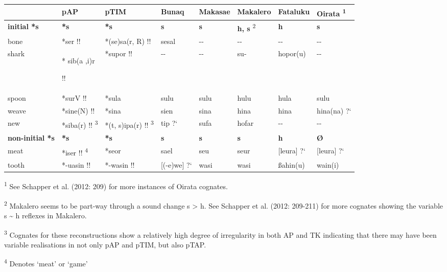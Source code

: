 \documentclass[a4paper]{article}
\begin{document}
\begin{center}
\tablehead{}
\begin{supertabular}{m{0.9677598in}m{0.9406598in}m{0.9004598in}m{0.63935983in}m{0.66775984in}m{0.7052598in}m{0.8316598in}m{0.65735984in}}
\hline
 &
pAP &
pTIM &
Bunaq &
Makasae &
Makalero &
Fataluku &
Oirata \textsuperscript{1}\\\hline
\textbf{initial *s} &
\textbf{*s} &
\textbf{*s} &
\textbf{s} &
\textbf{s} &
\textbf{h, s }\textsuperscript{2} &
\textbf{h} &
\textbf{s }\\\hline
bone &
*ser !! &
*(se)sa(r, R) !! &
sesal &
{}-{}- &
{}-{}- &
{}-{}- &
{}-{}-\\
shark &
* sib(a ,i)r

!! &
*supor !! &
{}-{}- &
{}-{}- &
su- &
hopor(u) &
{}-{}-\\
spoon &
*surV !! &
*sula &
sulu  &
sulu  &
hulu  &
hula  &
sulu \\
weave &
*sine(N) !! &
*sina &
sien  &
sina  &
hina  &
hina  &
hina(na) ?`\\
new  &
*siba(r) !! \textsuperscript{3} &
*(t, s)ipa(r) !! \textsuperscript{3} &
tip ?` &
sufa &
hofar &
{}-{}- &
{}-{}-\\\hline
\textbf{non-initial *s} &
\textbf{*s} &
\textbf{*s} &
\textbf{s} &
\textbf{s} &
\textbf{s} &
\textbf{h} &
\textbf{{\O}}\\\hline
meat &
*iser !! \textsuperscript{4} &
*seor &
sael &
seu &
seur &
[leura] ?` &
[leura] ?`\\
tooth\ \  &
*-uasin !!  &
*-wasin !! &
[(-e)we] ?` &
wasi &
wasi &
{\ss}ahin(u) &
wain(i)\\\hline
\end{supertabular}
\end{center}
\textsuperscript{1 }See Schapper et al. (2012: 209) for more instances of Oirata cognates.

\textsuperscript{2}\textbf{ }Makalero seems to be part-way through a sound change s {\textgreater} h. See Schapper et al. (2012: 209-211) for more cognates showing the variable s \~{} h reflexes in Makalero. 

\textsuperscript{3} Cognates for these reconstructions show a relatively high degree of irregularity in both AP and TK indicating that there may have been variable realisations in not only pAP and pTIM, but also pTAP.

\textsuperscript{4} Denotes {\textquoteleft}meat{\textquoteright} or {\textquoteleft}game{\textquoteright}
\end{document}
